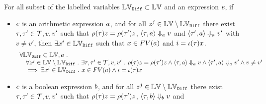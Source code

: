 \begin{lem}
	\label{lem:inv_expr_gnl}
	For all subset of the labelled variables $\mathbb{LV}_{\mathtt{Diff}} \subset \mathbb{LV}$
	and an expression $e$, if 
	\begin{itemize}
		\item $e$ is an arithmetic expression $a$,
		and for all $z^j \in \mathbb{LV} \setminus \mathbb{LV}_{\mathtt{Diff}}$ 
		there exist $\mathtt{\tau}, \mathtt{\tau}' \in \mathcal{T}, v, v'$ such that 
		$\rho(\mathtt{\tau}) z = \rho(\mathtt{\tau}') z$,
		$\langle \mathtt{\tau}, a \rangle \Downarrow_a v$ and 
		$\langle \mathtt{\tau}', a \rangle \Downarrow_a v'$ with $v \neq v'$,
		then $\exists x^i \in \mathbb{LV}_{\mathtt{Diff}} $ 
		such that $x \in FV(a)$ and $i = \iota(\mathtt{\tau}) x$.
		\[
			\begin{array}{l}
			\forall \mathbb{LV}_{\mathtt{Diff}}  \subset \mathbb{LV},  
			a ~.~ 
			\\ \quad
			\forall z^j \in \mathbb{LV} \setminus \mathbb{LV}_{\mathtt{Diff}} ~.~  
			\exists \mathtt{\tau}, \mathtt{\tau}' \in \mathcal{T}, v, v' ~.~  
			\rho(\mathtt{\tau}) z = \rho(\mathtt{\tau}') z 
			\land 
			\langle \mathtt{\tau}, a \rangle \Downarrow_a v 
			\land \langle \mathtt{\tau}', a \rangle \Downarrow_a v' \land v \neq v'
			\\ \quad
			\implies \exists x^i \in \mathbb{LV}_{\mathtt{Diff}} ~.~  
			x \in FV(a) \land i = \iota(\mathtt{\tau}) x
			\end{array}
		\]
	\item $e$ is a boolean expression $b$,
	and for all $z^j \in \mathbb{LV} \setminus \mathbb{LV}_{\mathtt{Diff}}$ 
	there exist $\mathtt{\tau}, \mathtt{\tau}' \in \mathcal{T}, v, v'$ such that 
	$\rho(\mathtt{\tau}) z = \rho(\mathtt{\tau}') z$,
	$\langle \mathtt{\tau}, b \rangle \Downarrow_b v$ and 

\end{itemize}
\end{lem}
